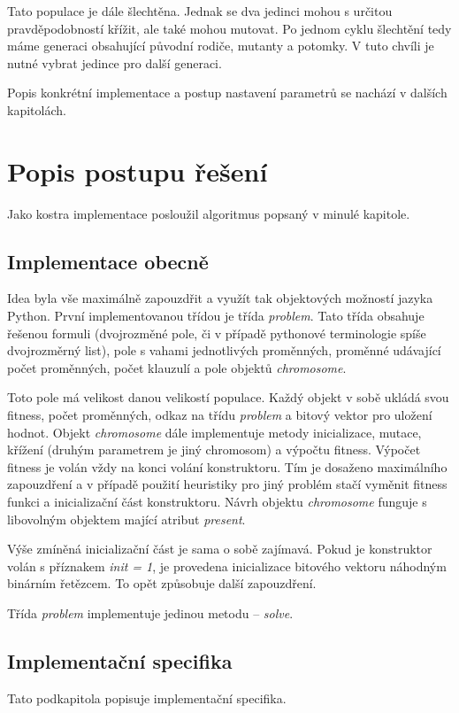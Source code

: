 \documentclass[a4paper]{article}
\begin{document}
	Tato populace je dále šlechtěna. Jednak se dva jedinci mohou s určitou pravděpodobností křížit, ale také mohou mutovat. Po jednom cyklu šlechtění tedy máme generaci obsahující původní rodiče, mutanty a potomky. V tuto chvíli je nutné vybrat jedince pro další generaci.
	
	Popis konkrétní implementace a postup nastavení parametrů se nachází v dalších kapitolách.
	

\section{Popis postupu řešení}
	Jako kostra implementace posloužil algoritmus popsaný v minulé kapitole.
	
	\subsection{Implementace obecně}
		Idea byla vše maximálně zapouzdřit a využít tak objektových možností jazyka Python. První implementovanou třídou je třída \textit{problem}. Tato třída obsahuje řešenou formuli (dvojrozměné pole, či v případě pythonové terminologie spíše dvojrozměrný list), pole s vahami jednotlivých proměnných, proměnné udávající počet proměnných, počet klauzulí a pole objektů \textit{chromosome}.
		
		Toto pole má velikost danou velikostí populace. Každý objekt v sobě ukládá svou fitness, počet proměnných, odkaz na třídu \textit{problem} a bitový vektor pro uložení hodnot. Objekt \textit{chromosome} dále implementuje metody inicializace, mutace, křížení (druhým parametrem je jiný chromosom) a výpočtu fitness. Výpočet fitness je volán vždy na konci volání konstruktoru. Tím je dosaženo maximálního zapouzdření a v případě použití heuristiky pro jiný problém stačí vyměnit fitness funkci a inicializační část konstruktoru. Návrh objektu \textit{chromosome} funguje s libovolným objektem mající atribut \textit{present}.
		
		Výše zmíněná inicializační část je sama o sobě zajímavá. Pokud je konstruktor volán s příznakem \textit{init = 1}, je provedena inicializace bitového vektoru náhodným binárním řetězcem. To opět způsobuje další zapouzdření.
		
		Třída \textit{problem} implementuje jedinou metodu -- \textit{solve}. 
	
	\subsection{Implementační specifika}
		Tato podkapitola popisuje implementační specifika.
	
\end{document}
